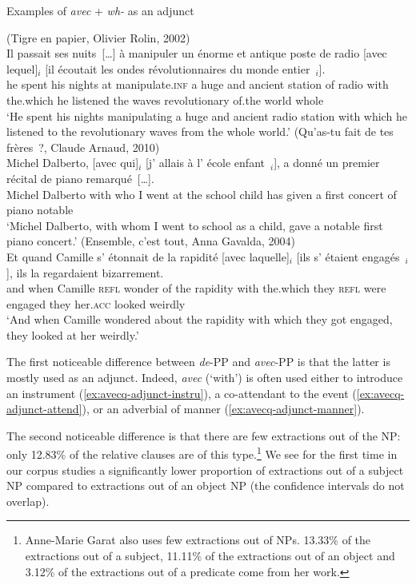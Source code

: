 \begin{exe}
\ex Examples of \emph{avec} + \emph{wh-} as an adjunct \label{ex:avecq-adjunct}
    \begin{xlist}
        \ex (Tigre en papier, Olivier Rolin, 2002)\nopagebreak\\
\gll Il passait ses nuits~[\dots] à manipuler un énorme et antique poste de radio	[avec	lequel]$_i$ [il écoutait les ondes révolutionnaires du monde entier~\trace{}$_i$].\\
he spent his nights at manipulate\textsc{.inf} a huge and ancient station of radio with the.which he listened the waves revolutionary of.the world whole\\
\glt `He spent his nights manipulating a huge and ancient radio station with which he listened to the revolutionary waves from the whole world.'
\label{ex:avecq-adjunct-instru}
\ex (Qu'as-tu fait de tes frères~?, Claude Arnaud, 2010)\\
\gll Michel Dalberto, [avec qui]$_i$ [j' allais à l' école enfant~\trace{}$_i$], a donné un premier récital de piano remarqué~[\dots].\\
Michel Dalberto with who I went at the school child has given a first concert of piano notable\\
\glt `Michel Dalberto, with whom I went to school as a child, gave a notable first piano concert.'
\label{ex:avecq-adjunct-attend}
\ex (Ensemble, c'est tout, Anna Gavalda, 2004)\\
\gll Et quand Camille s' étonnait de la rapidité [avec laquelle]$_i$ [ils s' étaient engagés~\trace{}$_i$], ils la regardaient bizarrement.\\
and when Camille \textsc{refl} wonder of the rapidity with the.which they \textsc{refl} were engaged they her\textsc{.acc} looked weirdly\\
\glt `And when Camille wondered about the rapidity with which they got engaged, they looked at her weirdly.'
\label{ex:avecq-adjunct-manner}
    \end{xlist}
\end{exe}

The first noticeable difference between \emph{de}-PP and \emph{avec}-PP is that the latter is mostly used as an adjunct. Indeed, \emph{avec} (`with') is often used either to introduce an instrument (\ref{ex:avecq-adjunct-instru}), a co-attendant to the event (\ref{ex:avecq-adjunct-attend}), or an adverbial of manner (\ref{ex:avecq-adjunct-manner}). 

The second noticeable difference is that there are few extractions out of the NP: only 12.83\% of the relative clauses are of this type.\footnote{Anne-Marie Garat also uses few extractions out of NPs. 13.33\% of the extractions out of a subject, 11.11\% of the extractions out of an object and 3.12\% of the extractions out of a predicate come from her work.} We see for the first time in our corpus studies a significantly lower proportion of extractions out of a subject NP compared to extractions out of an object NP (the confidence intervals do not overlap).

